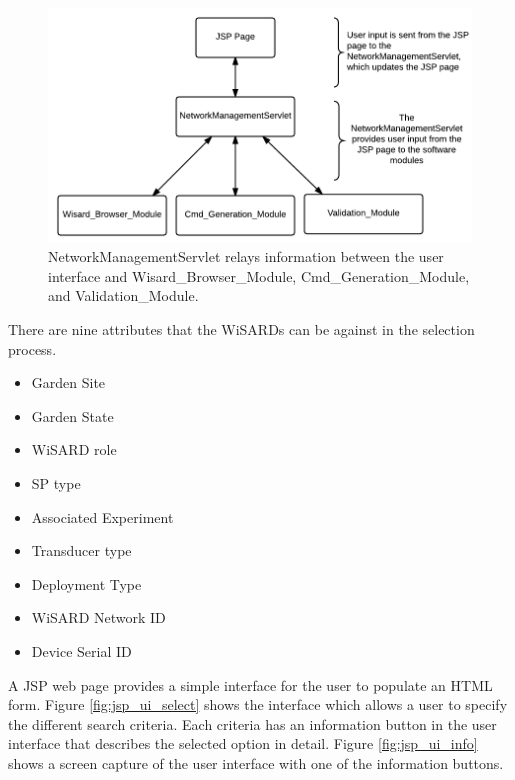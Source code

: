 \begin{figure}[H]
	\centering
	\includegraphics[width=\textwidth]{figures/jsp_interaction.png}
	\caption{NetworkManagementServlet relays information between the user interface and Wisard\_Browser\_Module, Cmd\_Generation\_Module, and Validation\_Module.}
	\label{fig:jsp_interaction}
\end{figure} 

There are nine attributes that the WiSARDs can be against in the selection process.
\begin{itemize}
	\item Garden Site
	\item Garden State
	\item WiSARD role
	\item SP type
	\item Associated Experiment
	\item Transducer type
	\item Deployment Type
	\item WiSARD Network ID
	\item Device Serial ID
\end{itemize} 

A JSP web page provides a simple interface for the user to populate an HTML form. Figure \ref{fig:jsp_ui_select} shows the interface which allows a user to specify the different search criteria. Each criteria has an information button in the user interface that describes the selected option in detail. Figure \ref{fig:jsp_ui_info} shows a screen capture of the user interface with one of the information buttons.

